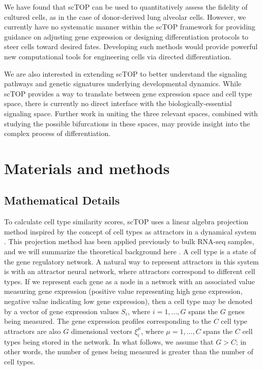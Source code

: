 \documentclass[vruler,JEB]{COB}%
\begin{document}
We have found that scTOP can be used to quantitatively assess the fidelity of cultured cells, as in the case of donor-derived lung alveolar cells. However, we currently have no systematic manner within the scTOP framework for providing guidance on adjusting gene expression or designing differentiation protocols to steer cells toward desired fates. Developing such methods would provide powerful new computational tools for engineering cells via directed differentiation.

We are also interested in extending scTOP to better understand the signaling pathways and genetic signatures underlying developmental dynamics. While scTOP provides a way to translate between gene expression space and cell type space, there is currently no direct interface with the biologically-essential signaling space. Further work in uniting the three relevant spaces, combined with studying the possible bifurcations in these spaces, may provide insight into the complex process of differentiation.

\section{Materials and methods}

\subsection{Mathematical Details}
To calculate cell type similarity scores, scTOP uses a linear algebra projection method inspired by the concept of cell types as attractors in a dynamical system \citep{huang_cell_2005}. This projection method has been applied previously to bulk RNA-seq samples, and we will summarize the theoretical background here \citep{lang_epigenetic_2014}. A cell type is a state of the gene regulatory network. A natural way to represent attractors in this system is with an attractor neural network, where attractors correspond to different cell types. If we represent each gene as a node in a network with an associated value measuring gene expression (positive value representing high gene expression, negative value indicating low gene expression), then a cell type may be denoted by a vector of gene expression values $S_i$, where $i=1,\ldots, G$ spans the $G$ genes being measured. The gene expression profiles
corresponding to the $C$ cell type attractors are also $G$ dimensional vectors $\xi_i^\mu$, where $\mu=1,\ldots, C$ spans the $C$ cell types being stored in the network. In what follows, we assume that $G > C$; in other words, the number of genes being measured is greater than the number of cell types.
\end{document}
